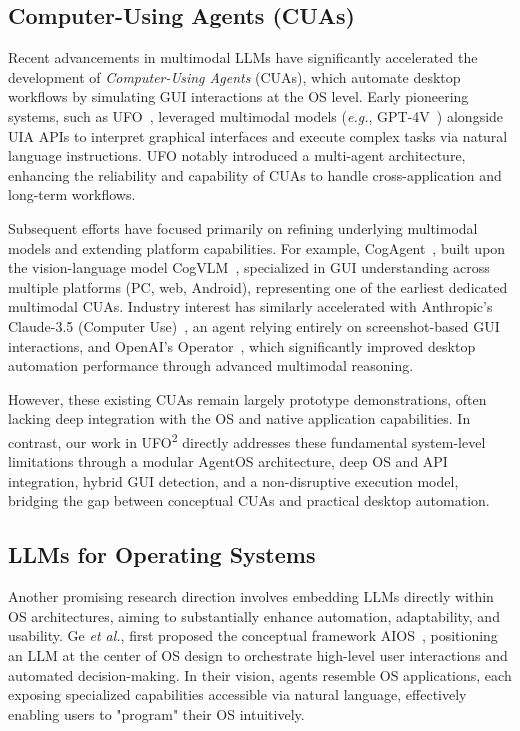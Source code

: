 \documentclass[sigplan,10pt]{acmart}
\newcommand{\name}{\textsc{UFO}\textsuperscript{2}\xspace}
\newcommand{\eg}{\textit{e.g.},\xspace}
\newcommand{\etal}{\textit{et al.},\xspace}
\begin{document}
\subsection{Computer-Using Agents (CUAs)}

Recent advancements in multimodal LLMs have significantly accelerated the development of \emph{Computer-Using Agents} (CUAs), which automate desktop workflows by simulating GUI interactions at the OS level. Early pioneering systems, such as UFO~\cite{zhang2024ufo}, leveraged multimodal models (\eg GPT-4V~\cite{yang2023dawn}) alongside UIA APIs to interpret graphical interfaces and execute complex tasks via natural language instructions. UFO notably introduced a multi-agent architecture, enhancing the reliability and capability of CUAs to handle cross-application and long-term workflows.

Subsequent efforts have focused primarily on refining underlying multimodal models and extending platform capabilities. For example, CogAgent~\cite{hong2024cogagent}, built upon the vision-language model CogVLM~\cite{wang2024cogvlm}, specialized in GUI understanding across multiple platforms (PC, web, Android), representing one of the earliest dedicated multimodal CUAs. Industry interest has similarly accelerated with Anthropic's Claude-3.5 (Computer Use)~\cite{anthropic2024}, an agent relying entirely on screenshot-based GUI interactions, and OpenAI's Operator~\cite{cua2025}, which significantly improved desktop automation performance through advanced multimodal reasoning.

However, these existing CUAs remain largely prototype demonstrations, often lacking deep integration with the OS and native application capabilities. In contrast, our work in \name directly addresses these fundamental system-level limitations through a modular AgentOS architecture, deep OS and API integration, hybrid GUI detection, and a non-disruptive execution model, bridging the gap between conceptual CUAs and practical desktop automation.

\subsection{LLMs for Operating Systems}

Another promising research direction involves embedding LLMs directly within OS architectures, aiming to substantially enhance automation, adaptability, and usability. Ge \etal first proposed the conceptual framework AIOS~\cite{ge2023llm}, positioning an LLM at the center of OS design to orchestrate high-level user interactions and automated decision-making. In their vision, agents resemble OS applications, each exposing specialized capabilities accessible via natural language, effectively enabling users to "program" their OS intuitively.
\end{document}
